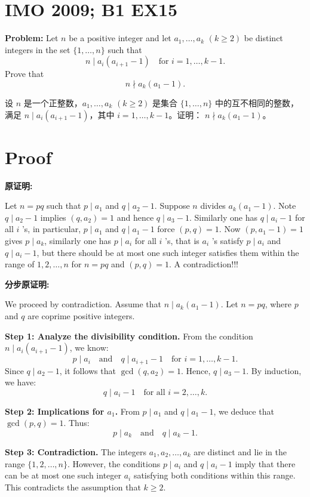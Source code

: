 \documentclass[a4paper]{article}
\begin{document}
\section*{IMO 2009; B1 EX15}
    \textbf{Problem:}
    Let $n$ be a positive integer and let $a_1,\ldots,a_k$ $(k \geq 2)$ be distinct integers in the set $\{1,\ldots,n\}$ such that 
    \[n \mid a_i(a_{i+1}-1) \quad \text{for } i = 1,\ldots,k-1.\]
    Prove that 
    \[n \nmid a_k(a_1-1).\]

    \[ \]
    设 $n$ 是一个正整数，$a_1, \ldots, a_k$ $(k \geq 2)$ 是集合 $\{1, \ldots, n\}$ 中的互不相同的整数，满足
    $n \mid a_i(a_{i+1}-1)$，其中 $i = 1, \ldots, k-1$。证明：
    $n \nmid a_k(a_1-1)$。


\section*{Proof}

    \textbf{原证明:}

    Let $n=pq$ such that $p\mid a_1$ and $q\mid a_2-1$.
    Suppose $n$ divides $a_k(a_1-1)$. Note $q\mid a_2-1$ implies $(q,a_2)=1$ and hence $q\mid a_3-1$. 
    Similarly one has $q\mid a_i-1$ for all $i$ 's, in particular, 
    $p\mid a_1$ and $q\mid a_1-1$ force $(p,q)=1$. 
    Now $(p,a_1-1)=1$ gives $p\mid a_k$, similarly one has $p\mid a_i$ for all $i$ 's, that is $a_i$ 's satisfy $p\mid a_i$ and $q\mid a_i-1$, 
    but there should be at most one such integer satisfies them within the range of $1,2,\ldots,n$ for $n=pq$ and $(p,q)=1$. 
    A contradiction!!!

    \[\]
    \textbf{分步原证明:}

    We proceed by contradiction. Assume that $n \mid a_k(a_1-1)$. Let $n = pq$, where $p$ and $q$ are coprime positive integers.

    \textbf{Step 1: Analyze the divisibility condition.}  
    From the condition $n \mid a_i(a_{i+1}-1)$, we know:
    \[p \mid a_i \quad \text{and} \quad q \mid a_{i+1}-1 \quad \text{for } i = 1,\ldots,k-1.\]
    Since $q \mid a_2-1$, it follows that $\gcd(q, a_2) = 1$. Hence, $q \mid a_3-1$. By induction, we have:
    \[q \mid a_i-1 \quad \text{for all } i = 2,\ldots,k.\]

    \textbf{Step 2: Implications for $a_1$.}  
    From $p \mid a_1$ and $q \mid a_1-1$, we deduce that $\gcd(p, q) = 1$. Thus:
    \[p \mid a_k \quad \text{and} \quad q \mid a_k-1.\]

    \textbf{Step 3: Contradiction.}  
    The integers $a_1, a_2, \ldots, a_k$ are distinct and lie in the range $\{1, 2, \ldots, n\}$. 
    However, the conditions $p \mid a_i$ and $q \mid a_i-1$ imply that there can be at most one such integer $a_i$ satisfying both conditions within this range. 
    This contradicts the assumption that $k \geq 2$. 
\end{document}
